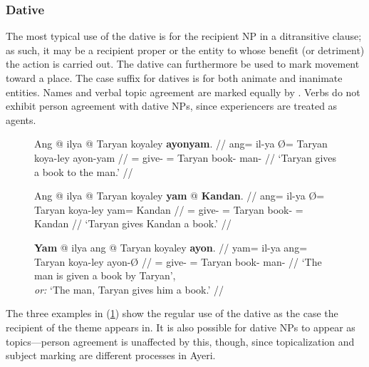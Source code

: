\subsubsection{Dative}
\label{subsubsec:dative}

The most typical use of the dative is for the recipient NP in a ditransitive
clause; as such, it may be a recipient proper or the entity to whose benefit (or detriment)
the action is carried out. The dative can furthermore be used to mark movement
toward a place. The case suffix for datives is  for both
animate and inanimate entities. Names and verbal topic agreement are marked
equally by . Verbs do not exhibit person agreement with dative
NPs, since experiencers are treated as agents.

\begin{figure}[h]
\pex\label{ex:datregular}
\a\begingl
	\gla Ang @ ilya {} @ Taryan koyaley \textbf{ayonyam}. //
	\glb ang= il-ya Ø= Taryan koya-ley ayon-yam //
	\glc \AgtT{}= give-\TsgM{} \Top{}= Taryan book-\PargI{} 
		man-\Dat{} //
	\glft `Taryan gives a book to the man.' //
\endgl

\a\begingl
	\gla Ang @ ilya {} @ Taryan koyaley \textbf{yam} @ \textbf{Kandan}. //
	\glb ang= il-ya Ø= Taryan koya-ley yam= Kandan //
	\glc \AgtT{}= give-\TsgM{} \Top{}= Taryan book-\PargI{} \Dat{}= Kandan //
	\glft `Taryan gives Kandan a book.' //
\endgl

\a\begingl
	\gla \textbf{Yam} @ ilya ang @ Taryan koyaley \textbf{ayon}. //
	\glb yam= il-ya ang= Taryan koya-ley ayon-Ø //
	\glc \DatT{}= give-\TsgM{} \Aarg{}= Taryan book-\PargI{} man-\Top{} //
	\glft `The man is given a book by Taryan',\\
		\textit{or:} `The man, Taryan gives him a book.' //
\endgl
\xe
\end{figure}

The three examples in (\ref{ex:datregular}) show the regular use of the dative
as the case the recipient of the theme appears in. It is also possible for
dative NPs to appear as topics---person agreement is unaffected by this,
though, since topicalization and subject marking are different processes in
Ayeri.

